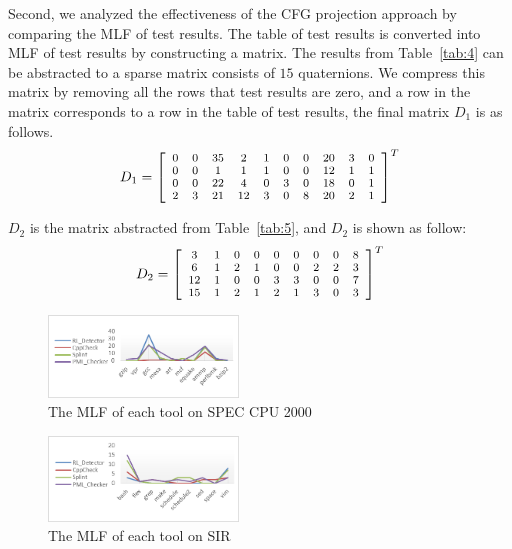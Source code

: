 Second, we analyzed the effectiveness of the CFG projection approach by comparing the MLF of test results. The table of test  results is converted into MLF of test results by constructing a matrix. The results from Table~\ref{tab:4} can be abstracted to a sparse matrix consists of $15$ quaternions. We compress this matrix by removing all the rows that test results are zero, and a row in the matrix corresponds to a row in the table of test results, the final matrix $D_1$ is as follows.
\[
\scriptsize
D_1=\left[
\begin{array}{cccccccccc}
0 & 0 & 35 & 2 & 1 & 0 & 0 & 20 & 3 & 0\\
0 & 0 & 1  &  1 & 1 & 0 & 0 & 12 & 1 & 1\\
0 & 0 & 22 & 4 & 0 & 3 & 0 & 18 & 0 & 1 \\
2 & 3 & 21 & 12 & 3& 0 & 8 & 20 & 2 & 1  
\end{array}
\right]^{T}
\]

$D_2$ is the matrix abstracted from Table~\ref{tab:5}, and $D_2$ is shown as follow:
\[
\scriptsize
D_2=\left[
\begin{array}{ccccccccc}
3 & 1 & 0 & 0 & 0 & 0 & 0 & 0 & 8 \\
6 & 1 & 2 &  1 & 0 & 0 & 2 & 2 & 3\\
12 & 1 & 0 & 0 & 3 & 3 & 0 & 0 & 7 \\
15 & 1 & 2& 1 & 2 & 1 & 3 & 0 & 3  
\end{array}
\right]^{T}
\]

\begin{figure}[!h]
\center
\includegraphics[width=0.45\textwidth]{figure/fig8-fig12/fig10}
\caption{The MLF of each tool on SPEC CPU 2000}
\label{fig:10}
\end{figure}

\begin{figure}[!h]
\center
\includegraphics[width=0.45\textwidth]{figure/fig8-fig12/fig11}
\caption{The MLF of each tool on SIR}
\label{fig:11}
\end{figure}

